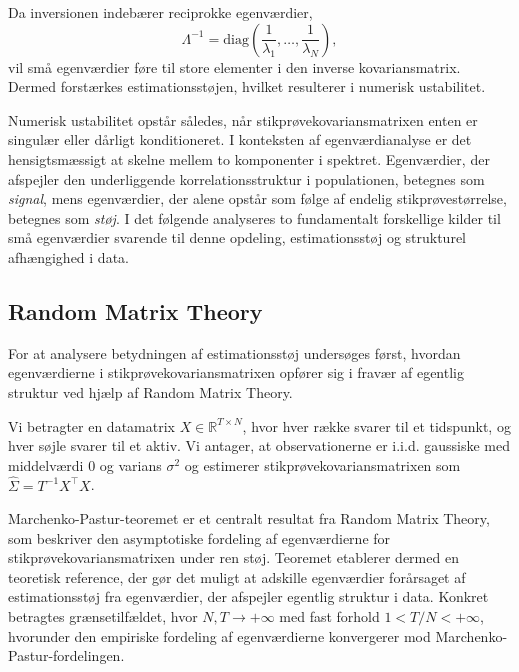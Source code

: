\documentclass[../main.tex]{subfiles}
\begin{document}
Da inversionen indebærer reciprokke egenværdier,
\begin{equation}
    \Lambda^{-1} = \mathrm{diag}\left(\frac{1}{\lambda_1}, \ldots, \frac{1}{\lambda_N}\right),
\end{equation}
vil små egenværdier føre til store elementer i den inverse kovariansmatrix. Dermed forstærkes estimationsstøjen, hvilket resulterer i numerisk ustabilitet.

Numerisk ustabilitet opstår således, når stikprøvekovariansmatrixen enten er singulær
eller dårligt konditioneret. I konteksten af egenværdianalyse er det hensigtsmæssigt at
skelne mellem to komponenter i spektret. Egenværdier, der afspejler den underliggende
korrelationsstruktur i populationen, betegnes som \textit{signal}, mens egenværdier,
der alene opstår som følge af endelig stikprøvestørrelse, betegnes som \textit{støj}.
I det følgende analyseres to fundamentalt forskellige kilder til små egenværdier
svarende til denne opdeling, estimationsstøj og strukturel afhængighed i data.


\subsection{Random Matrix Theory}


For at analysere betydningen af estimationsstøj undersøges først, hvordan egenværdierne i stikprøvekovariansmatrixen opfører sig i fravær af egentlig struktur ved hjælp af Random Matrix Theory.

Vi betragter en datamatrix $X \in \mathbb{R}^{T \times N}$, hvor hver række svarer til et tidspunkt, og hver søjle svarer til et aktiv. Vi antager, at observationerne er i.i.d. gaussiske med middelværdi $0$ og varians $\sigma^2$ og estimerer stikprøvekovariansmatrixen som $\hat{\Sigma}=T^{-1}X^\top X$.

Marchenko-Pastur-teoremet er et centralt resultat fra Random Matrix Theory, som beskriver den asymptotiske fordeling af egenværdierne for stikprøvekovariansmatrixen under ren støj. Teoremet etablerer dermed en teoretisk reference, der gør det muligt at adskille egenværdier forårsaget af estimationsstøj fra egenværdier, der afspejler egentlig struktur i data. Konkret betragtes grænsetilfældet, hvor $N,T\to+\infty$ med fast forhold $1<T/N<+\infty$, hvorunder den empiriske fordeling af egenværdierne konvergerer mod Marchenko-Pastur-fordelingen.
\end{document}
